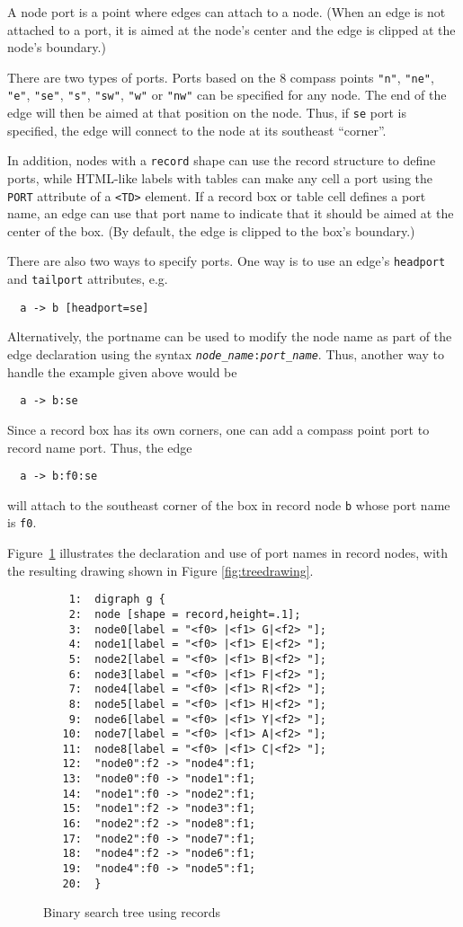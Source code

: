 \documentclass[11pt]{article}
\begin{document}
{A node port is a point where edges can attach to a node.
(When an edge is not attached to a port, it is aimed at the node's center
and the edge is clipped at the node's boundary.)

There are two types of ports. Ports based on the
8 compass points {\tt "n"}, {\tt "ne"}, {\tt "e"}, {\tt "se"}, 
{\tt "s"}, {\tt "sw"}, {\tt "w"} or  {\tt "nw"} can be specified
for any node. The end of the
edge will then be aimed at that position on the node. Thus, if
{\tt se} port is specified, the edge will connect to the node at
its southeast ``corner''.

In addition, nodes with a {\tt record} shape can use the 
record structure to define ports, while HTML-like labels
with tables can make any cell a port using the
\verb"PORT" attribute of a \verb"<TD>" element.
If a record box or table cell defines a port name, 
an edge can use that port name
to indicate that it should be aimed at
the center of the box. 
(By default, the edge is clipped to the box's boundary.)

There are also two ways to specify ports. One way is to use 
an edge's {\tt headport} and {\tt tailport} attributes, e.g.
\begin{verbatim}
  a -> b [headport=se]
\end{verbatim}
Alternatively, the portname can be used to modify the node name as part of the
edge declaration using the syntax {\tt {\it node\_name}:{\it port\_name}}.
Thus, another way to handle the example given above would be
\begin{verbatim}
  a -> b:se
\end{verbatim}

Since a record box has its own corners, one can add a compass point
port to record name port. Thus, the edge
\begin{verbatim}
  a -> b:f0:se
\end{verbatim}
will attach to the southeast corner of the box in record node {\tt b}
whose port name is {\tt f0}.

Figure~\ref{fig:tree} illustrates the declaration and use of
port names in record nodes, with the resulting drawing shown
in Figure \ref{fig:treedrawing}.

\begin{figure}[p]\footnotesize
\begin{verbatim}
    1:  digraph g {
    2:  node [shape = record,height=.1];
    3:  node0[label = "<f0> |<f1> G|<f2> "];
    4:  node1[label = "<f0> |<f1> E|<f2> "];
    5:  node2[label = "<f0> |<f1> B|<f2> "];
    6:  node3[label = "<f0> |<f1> F|<f2> "];
    7:  node4[label = "<f0> |<f1> R|<f2> "];
    8:  node5[label = "<f0> |<f1> H|<f2> "];
    9:  node6[label = "<f0> |<f1> Y|<f2> "];
   10:  node7[label = "<f0> |<f1> A|<f2> "];
   11:  node8[label = "<f0> |<f1> C|<f2> "];
   12:  "node0":f2 -> "node4":f1;
   13:  "node0":f0 -> "node1":f1;
   14:  "node1":f0 -> "node2":f1;
   15:  "node1":f2 -> "node3":f1;
   16:  "node2":f2 -> "node8":f1;
   17:  "node2":f0 -> "node7":f1;
   18:  "node4":f2 -> "node6":f1;
   19:  "node4":f0 -> "node5":f1;
   20:  }
\end{verbatim}
\caption{Binary search tree using records}
\label{fig:tree}
\end{figure}

}
\end{document}
